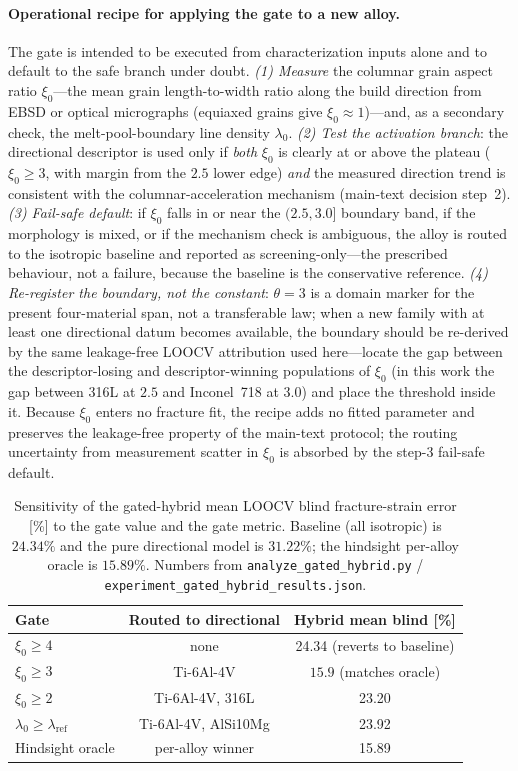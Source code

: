 \documentclass[11pt,a4paper,twocolumn]{article}
\begin{document}
\paragraph{Operational recipe for applying the gate to a new alloy.}
The gate is intended to be executed from characterization inputs alone and to default to the safe branch under doubt. \emph{(1) Measure} the columnar grain aspect ratio $\xi_0$---the mean grain length-to-width ratio along the build direction from EBSD or optical micrographs (equiaxed grains give $\xi_0\approx1$)---and, as a secondary check, the melt-pool-boundary line density $\lambda_0$. \emph{(2) Test the activation branch}: the directional descriptor is used only if \emph{both} $\xi_0$ is clearly at or above the plateau ($\xi_0\ge3$, with margin from the $2.5$ lower edge) \emph{and} the measured direction trend is consistent with the columnar-acceleration mechanism (main-text decision step~2). \emph{(3) Fail-safe default}: if $\xi_0$ falls in or near the $(2.5,3.0]$ boundary band, if the morphology is mixed, or if the mechanism check is ambiguous, the alloy is routed to the isotropic baseline and reported as screening-only---the prescribed behaviour, not a failure, because the baseline is the conservative reference. \emph{(4) Re-register the boundary, not the constant}: $\theta=3$ is a domain marker for the present four-material span, not a transferable law; when a new family with at least one directional datum becomes available, the boundary should be re-derived by the same leakage-free LOOCV attribution used here---locate the gap between the descriptor-losing and descriptor-winning populations of $\xi_0$ (in this work the gap between 316L at $2.5$ and Inconel~718 at $3.0$) and place the threshold inside it. Because $\xi_0$ enters no fracture fit, the recipe adds no fitted parameter and preserves the leakage-free property of the main-text protocol; the routing uncertainty from measurement scatter in $\xi_0$ is absorbed by the step-3 fail-safe default.

\begin{table}[tp]
\centering
\caption{Sensitivity of the gated-hybrid mean LOOCV blind fracture-strain error [\%] to the gate value and the gate metric. Baseline (all isotropic) is $24.34\%$ and the pure directional model is $31.22\%$; the hindsight per-alloy oracle is $15.89\%$. Numbers from \texttt{analyze\_gated\_hybrid.py} / \texttt{experiment\_gated\_hybrid\_results.json}.}
\label{tab:si_gate}
\footnotesize
\setlength{\tabcolsep}{4pt}
\begin{tabular}{lcc}
\toprule
\textbf{Gate} & \textbf{Routed to directional} & \textbf{Hybrid mean blind [\%]} \\
\midrule
$\xi_0\ge4$ & none & 24.34 (reverts to baseline) \\
$\xi_0\ge3$ & Ti-6Al-4V & $\mathbf{15.9}$ (matches oracle) \\
$\xi_0\ge2$ & Ti-6Al-4V, 316L & 23.20 \\
$\lambda_0\ge\lambda_{\mathrm{ref}}$ & Ti-6Al-4V, AlSi10Mg & 23.92 \\
Hindsight oracle & per-alloy winner & 15.89 \\
\bottomrule
\end{tabular}
\end{table}
\end{document}
